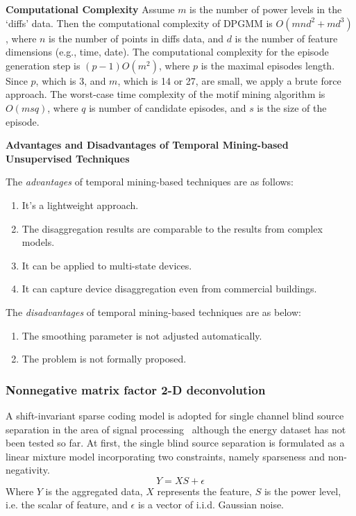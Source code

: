 \textbf{Computational Complexity}
Assume $m$ is
the number of power levels in the `diffs' data. Then the computational complexity of
DPGMM is $O(mnd^2+md^3)$, where $n$ is the number of points in diffs data,
and $d$ is the number of feature dimensions (e.g.,  time, date).
The computational complexity
for the episode generation step is $(p-1)O(m^2)$, where $p$ is the
maximal
episodes length. Since $p$, which is 3, and $m$, which is 14 or 27, are small,
we apply a brute force approach. The worst-case time complexity of the motif
mining algorithm is $O(msq)$, where $q$ is number of candidate episodes, and
$s$ is the size of the episode.

\textbf{Advantages and Disadvantages of Temporal Mining-based Unsupervised Techniques}

The \textit{advantages} of temporal mining-based techniques are as follows:
\begin{enumerate}
\item It's a lightweight approach. 
\item The disaggregation results are comparable to the results from 
complex models. 
\item It can be applied to multi-state devices. 
\item It can capture device disaggregation even from commercial buildings. 
\end{enumerate}


The \textit{disadvantages} of temporal mining-based techniques are as below:
\begin{enumerate}
\item The smoothing parameter is not adjusted automatically. 
\item The problem is not formally proposed.  
\end{enumerate}

\iffalse
\subsubsection{Nonnegative matrix factor 2-D deconvolution}
A shift-invariant sparse coding model is adopted for single channel blind source separation 
in the area of signal processing~\cite{blumensath2005shift} although 
the energy dataset has not been tested so far. 
At first, the single blind source separation is formulated as a linear mixture model incorporating 
two constraints, namely sparseness and non-negativity. 
\begin{equation}
Y= XS+\epsilon
\end{equation}
Where $Y$ is the aggregated data, 
$X$ represents the feature, 
$S$ is the power level, i.e. the scalar of feature, 
and $\epsilon$ is a vector of i.i.d. Gaussian noise. 

